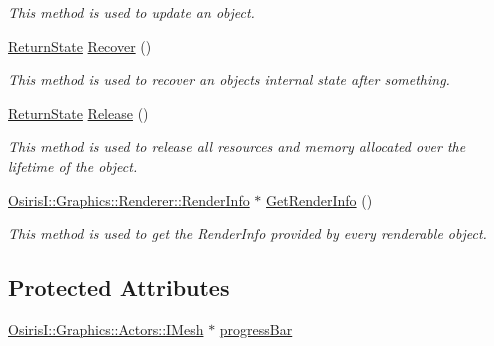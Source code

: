 \begin{DoxyCompactItemize}
\begin{DoxyCompactList}\small\item\em This method is used to update an object. \end{DoxyCompactList}\item 
\hyperlink{namespace_osiris_i_a8f53bf938dc75c65c6a529694514013e}{Return\-State} \hyperlink{class_osiris_i_1_1_graphics_1_1_components_1_1_o_s___progress_bar_a41ea53634f5474dd776ea53fcdc8e0ed}{Recover} ()
\begin{DoxyCompactList}\small\item\em This method is used to recover an objects internal state after something. \end{DoxyCompactList}\item 
\hyperlink{namespace_osiris_i_a8f53bf938dc75c65c6a529694514013e}{Return\-State} \hyperlink{class_osiris_i_1_1_graphics_1_1_components_1_1_o_s___progress_bar_a6dff17825f4b7fc82058b16b866564a6}{Release} ()
\begin{DoxyCompactList}\small\item\em This method is used to release all resources and memory allocated over the lifetime of the object. \end{DoxyCompactList}\item 
\hyperlink{struct_osiris_i_1_1_graphics_1_1_renderer_1_1_render_info}{Osiris\-I\-::\-Graphics\-::\-Renderer\-::\-Render\-Info} $\ast$ \hyperlink{class_osiris_i_1_1_graphics_1_1_components_1_1_o_s___progress_bar_a47e2d745ead51660efcbf9c840ae3022}{Get\-Render\-Info} ()
\begin{DoxyCompactList}\small\item\em This method is used to get the Render\-Info provided by every renderable object. \end{DoxyCompactList}\end{DoxyCompactItemize}
\subsection*{Protected Attributes}
\begin{DoxyCompactItemize}
\item 
\hyperlink{class_osiris_i_1_1_graphics_1_1_actors_1_1_i_mesh}{Osiris\-I\-::\-Graphics\-::\-Actors\-::\-I\-Mesh} $\ast$ \hyperlink{class_osiris_i_1_1_graphics_1_1_components_1_1_o_s___progress_bar_a57b534d3cf1571b946c4ae81422d9327}{progress\-Bar}
\end{DoxyCompactItemize}


